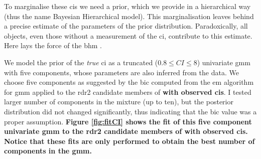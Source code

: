 To marginalise these \glspl{ci} we need a prior, which we provide in a hierarchical way (thus the name Bayesian Hierarchical model). This marginalisation leaves behind a precise estimate of the parameters of the prior distribution. Paradoxically, all objects, even those without a measurement of the \gls{ci}, contribute to this estimate. Here lays the force of the \gls{bhm} .

We model the prior of the \emph{true} \gls{ci} as a truncated ($0.8\leq CI \leq8$) univariate \gls{gmm} with five components, whose parameters are also inferred from the data. We choose five components as suggested by the \gls{bic} computed from the \gls{em} algorithm for \gls{gmm} applied to the \gls{rdr2} candidate members of \citet{Bouy2015} \textbf{with observed \glspl{ci}}. I tested larger number of components in the mixture (up to ten), but the posterior distribution did not changed significantly, thus indicating that the \gls{bic} value was a proper assumption. \textbf{Figure \ref{fig:fitCI} shows the fit of this five component univariate \gls{gmm} to the \gls{rdr2} candidate members of \citet{Bouy2015} with observed \glspl{ci}. Notice that these fits are only performed to obtain the best number of components in the \gls{gmm}.}

